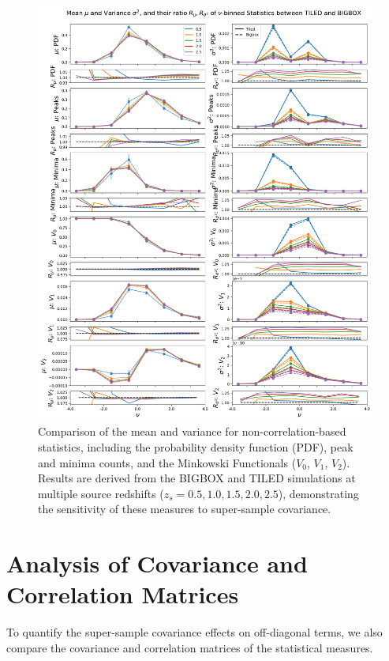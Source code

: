 \begin{figure}[p]
    \centering
    \includegraphics[width=\textwidth]{figures/results/nu_main.png}
    \caption[Comparison of Mean and Variance for Non-Correlation Statistics]
    {Comparison of the mean and variance for non-correlation-based statistics, including the probability density function (PDF), peak and minima counts, and the Minkowski Functionals ($V_0$, $V_1$, $V_2$). Results are derived from the BIGBOX and TILED simulations at multiple source redshifts ($z_s = 0.5, 1.0, 1.5, 2.0, 2.5$), demonstrating the sensitivity of these measures to super-sample covariance.}
    \label{fig:nu_main}
\end{figure}

\clearpage

\section{Analysis of Covariance and Correlation Matrices}
To quantify the super-sample covariance effects on off-diagonal terms, we also compare the covariance and correlation matrices of the statistical measures. 

